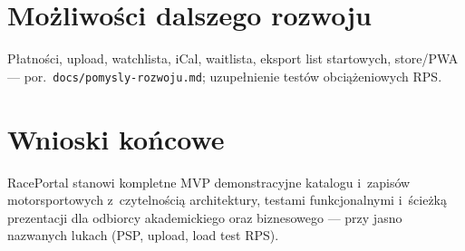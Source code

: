 \documentclass{sprz}
\begin{document}
\section{Możliwości dalszego rozwoju}  
Płatności, upload, watchlista, iCal, waitlista, eksport list startowych, store/PWA --- por.\ \texttt{docs/pomysly-rozwoju.md}; uzupełnienie testów obciążeniowych RPS.  
  
\section{Wnioski końcowe}  
RacePortal stanowi kompletne MVP demonstracyjne katalogu i~zapisów motorsportowych z~czytelnością architektury, testami funkcjonalnymi i~ścieżką prezentacji dla odbiorcy akademickiego oraz biznesowego --- przy jasno nazwanych lukach (PSP, upload, load test RPS).  
  
\printbibliography[title={Bibliografia}, heading=bibintoc]  
  
\clearpage  
{}  
{}  
\listoffigures  
  
\clearpage  
{}  
{}  
\listoftables  
  
\makethesisattachments  
  
\end{document}
